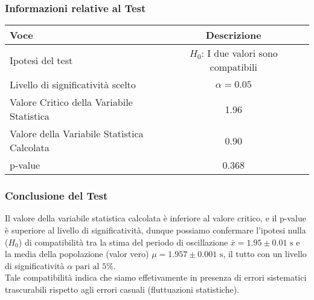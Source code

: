 \documentclass{article}
\begin{document}
\subsubsection{Informazioni relative al Test}

\begin{table}[ht]
    \centering
            \begin{tabular}{|l|c|p{10cm}|}
                \hline
                    \textbf{Voce} & \textbf{Descrizione} \\
                \hline
                    Ipotesi del test & \textbf{\(H_0\)}: I due valori sono compatibili \\
                \hline
                    Livello di significatività scelto & \(\alpha = 0.05\) \\
                \hline
                    Valore Critico della Variabile Statistica &  1.96 \\
                \hline
                    Valore della Variabile Statistica Calcolata & 0.90 \\
                \hline
                    p-value & 0.368 \\
                \hline          
            \end{tabular}
        \label{tab:gauss_test}
\end{table}

\subsubsection{Conclusione del Test}
Il valore della variabile statistica calcolata è inferiore al valore critico, e il p-value è superiore al livello di significatività, dunque possiamo confermare l'ipotesi nulla ($H_0$) di compatibilità tra la stima del periodo di oscillazione $\bar{x} = 1.95 \pm 0.01 \text{ s}$ e la media della popolazione (valor vero) $\mu = 1.957 \pm 0.001 \text{ s}$, il tutto con un livello di significatività $\alpha \text{ pari al } 5\%$.
\\Tale compatibilità indica che siamo effetivamente in presenza di errori sistematici trascurabili rispetto agli errori casuali (fluttuazioni statistiche).
\end{document}
